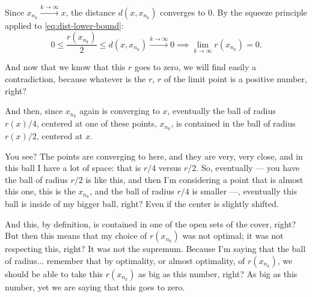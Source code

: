 \begin{proofWrapper}
\begin{content}
\begin{center}
\end{center}

Since $x_{n_k} \xrightarrow{k \to \infty} x$, the distance $d(x, x_{n_k})$ converges to $0$. By the squeeze principle applied to \eqref{eq:dist-lower-bound}:
\begin{equation}\label{eq:radius-goes-to-zero}
0 \le \frac{r(x_{n_k})}{2} \le d(x, x_{n_k}) \xrightarrow{k \to \infty} 0 \implies \lim_{k \to \infty} r(x_{n_k}) = 0.
\end{equation}
\end{content}

\begin{speech}[00:07:35 - 00:10:05]
And now that we know that this $r$ goes to zero, we will find easily a contradiction, because whatever is the $r$, $r$ of the limit point is a positive number, right? 

And then, since $x_{n_k}$ again is converging to $x$,  eventually the ball of radius $r(x)/4$, centered at one of these points, $x_{n_k}$, is contained in the ball of radius $r(x)/2$, centered at $x$. 

You see? The points are converging to here, and they are very, very close, and in this ball I have a lot of space: that is $r/4$ versus $r/2$. So, eventually --- you have the ball of radius $r/2$ is like this, and then I'm considering a point that is almost this one, this is the $x_{n_k}$, and the ball of radius $r/4$ is smaller ---, eventually this ball is inside of my bigger ball, right? Even if the center is slightly shifted.

And this, by definition, is contained in one of the open sets of the cover, right? But then this means that my choice of $r(x_{n_k})$ was not optimal; it was not respecting this, right? It was not the supremum. Because I'm saying that the ball of radius... remember that by optimality, or almost optimality, of $r(x_{n_k})$,  we should be able to take this $r(x_{n_k})$ as big as this number, right? As big as this number, yet we are saying that this goes to zero.


\end{speech}
\end{proofWrapper}
